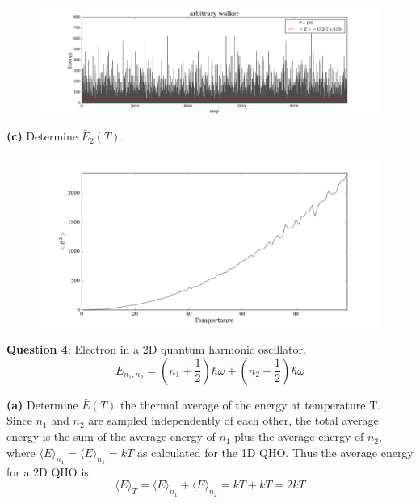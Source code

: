 \documentclass{article}
\begin{document}
\begin{figure}[H]
\begin{center}
\includegraphics[width=16cm]{../output/arbitrary/walkers.png} 
\end{center}
\end{figure}

\textbf{(c)} Determine $\bar{E}_{2}(T)$. 

\begin{figure}[H]
\begin{center}
\includegraphics[width=16cm]{../output/arbitrary/expected_sq.png} 
\end{center}
\end{figure}

\bigskip
\textbf{Question 4}: Electron in a 2D quantum harmonic oscillator. 
	\[E_{n_1, n_2} = \left(n_1 + \frac{1}{2} \right)\hbar\omega + \left(n_2 + \frac{1}{2} \right)\hbar\omega \]

\textbf{(a)} Determine $\bar{E}(T)$ the thermal average of the energy at temperature T. \\

Since $n_1$ and $n_2$ are sampled independently of each other, the total average energy is the sum of the average energy of $n_1$ plus the average energy of $n_2$, where $\langle E\rangle_{n_1} = \langle E\rangle_{n_1} = kT$ as calculated for the 1D QHO. Thus the average energy for a 2D QHO is:
	\[\langle E\rangle_{T} = \langle E\rangle_{n_1} + \langle E\rangle_{n_2} = kT + kT = 2kT \]
\end{document}
